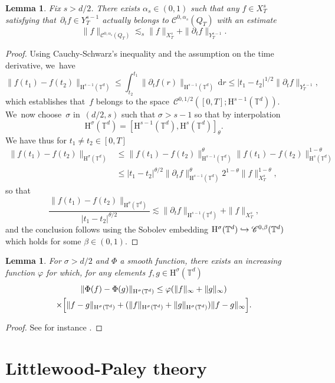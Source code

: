 \documentclass[JEP,XML,SOM,Unicode,published]{cedram}
\newcommand\hto{\mathrel{\lhook\joinrel\to}}
\newtheorem{lem}[prop]{Lemma}
\theoremstyle{definition}
\newcommand\T{\mathbb{T}}
\newcommand\dd{\mathrm{d}}
\renewcommand\H{\mathrm{H}}
\let\ffi\varphi
\begin{document}
\begin{lem}\label{lem:sobo2}
Fix $s>d/2$. There exists $\alpha_s\in(0,1)$ such that any $f\in X_T^s$ satisfying that~$\partial_t f \in Y_T^{s-1}$ actually belongs to $\mathscr{C}^{0,\alpha_s}(Q_T)$ with an estimate
\[
\|f\|_{\mathscr{C}^{0,\alpha_s}(Q_T)}\lesssim_s \|f\|_{X_T^s} + \|\partial_t f\|_{Y_T^{s-1}}.
\]
\end{lem}
\begin{proof}
Using Cauchy-Schwarz's inequality and the assumption on the time derivative, we~have
\[
\|f(t_1)-f(t_2)\|_{\H^{s-1}(\T^d)} \leq \int_{t_2}^{t_1}\| \partial_t f(r)\|_{\H^{s-1}(\T^d)}\,\dd r \leq |t_1-t_2|^{1/2}\|\partial_t f\|_{Y_T^{s-1}},
\]
which establishes that~$f$ belongs to the space~$\mathscr{C}^{0,1/2}([0,T];\H^{s-1}(\T^d))$. We~now choose~$\sigma $ in~$(d/2,s)$ such that $\sigma>s-1$ so that by interpolation
\[
\H^\sigma(\T^d) = [\H^{s-1}(\T^d),\H^{s}(\T^d)]_\theta.
\]
We have thus for $t_1\neq t_2\in [0,T]$
\begin{align*}\|f(t_1)-f(t_2)\|_{\H^\sigma(\T^d)} &\leq \|f(t_1)-f(t_2)\|_{\H^{s-1}(\T^d)}^\theta \|f(t_1)-f(t_2)\|^{1-\theta}_{\H^{s}(\T^d)}\\
&\leq |t_1-t_2|^{\theta/2} \|\partial_t f\|_{\H^{s-1}(\T^d)}^{\theta} 2^{1-\theta} \|f\|_{X_T^s}^{1-\theta},\end{align*}
so that
\[
\frac{\|f(t_1)-f(t_2)\|_{\H^{\sigma}(\T^d)}}{|t_1-t_2|^{\theta/2}} \lesssim \|\partial_t f\|_{\H^{s-1}(\T^d)} + \|f\|_{X_T^s},
\]
and the conclusion follows using the Sobolev embedding $\H^\sigma(\T^d)\hto \mathscr{C}^{0,\beta}(\T^d)$ which holds for some $\beta\in(0,1)$.
\end{proof}

\begin{lem}\label{lem:lipsob}
For $\sigma>d/2$ and $\Phi$ a smooth function, there exists an increasing function $\ffi$ for which, for any elements $f,g\in\H^{\sigma}(\T^d)$
\begin{multline}\label{ineq:Alip}
\|\Phi(f)-\Phi(g)\|_{\H^\sigma(\T^d)} \leq \ffi(\|f\|_{\infty}+\|g\|_\infty) \\
\times \Bigl[ \|f-g\|_{\H^\sigma(\T^d)}+(\|f\|_{\H^\sigma(\T^d)}+\|g\|_{\H^\sigma(\T^d)})\|f-g\|_\infty\Bigr].
\end{multline}
\end{lem}

\begin{proof}
See for instance \cite[Cor.\,2.91]{BCD}.
\end{proof}
\section{Littlewood-Paley theory}\label{sec:LP}
\end{document}
